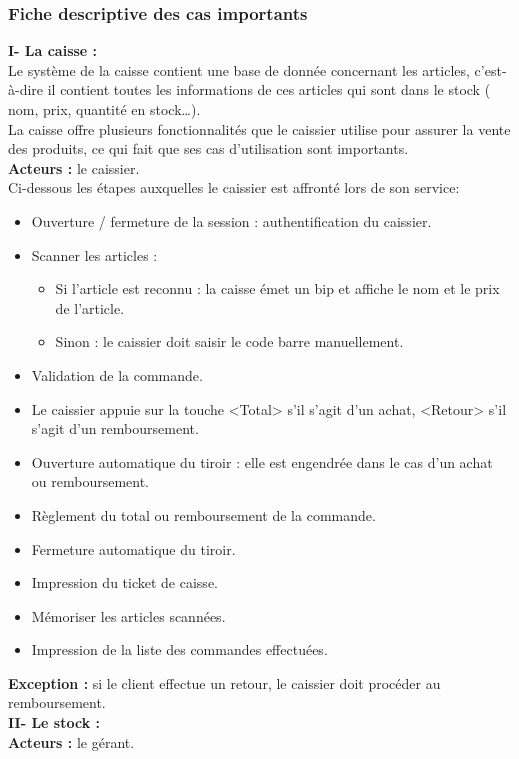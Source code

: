 \documentclass[french,10pt,a4paper]{report}
\begin{document}
\subsubsection{Fiche descriptive des cas importants} 
\textbf{I- La caisse :}\\
Le système de la caisse contient une base de donnée concernant les articles, c’est-à-dire il contient toutes les informations de ces articles qui sont dans le stock ( nom, prix, quantité en stock…).\\
La caisse offre plusieurs fonctionnalités que le caissier utilise pour assurer la vente des produits, ce qui fait que ses cas d’utilisation sont importants.\\
\textbf{Acteurs :} le caissier.\\
Ci-dessous les étapes auxquelles le caissier est affronté  lors de son service:
\begin{itemize}
\item Ouverture / fermeture de la session : authentification du caissier.
\item Scanner les articles :
	\begin{itemize}
		\item  Si l’article est reconnu : la caisse émet un bip et affiche le nom et le prix de l’article.
		\item Sinon : le caissier doit saisir le code barre manuellement.
	\end{itemize}
\item Validation de la commande.
\item Le caissier appuie sur la touche <Total> s’il s’agit d’un achat, <Retour> s’il s’agit d’un remboursement.
\item Ouverture automatique du tiroir : elle est engendrée dans le cas d’un achat ou remboursement.
\item Règlement du total ou remboursement de la commande.
\item Fermeture automatique du tiroir.
\item Impression du ticket de caisse.
\item Mémoriser les articles scannées.
\item Impression de la liste des commandes effectuées.
\end{itemize}		
\textbf{Exception :} si le client effectue un retour, le caissier doit procéder au remboursement.\\[1cm]
\textbf{II- Le stock :} \\
\textbf{Acteurs :} le gérant.\\
\end{document}
